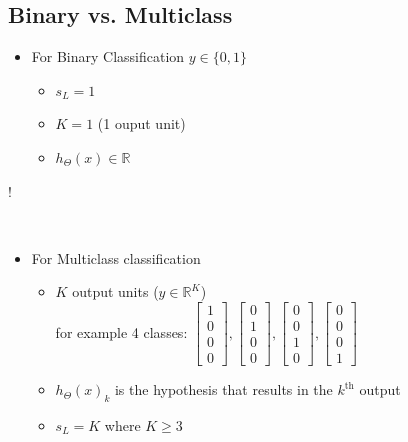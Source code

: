 \documentclass[a4paper,12pt]{report}
\begin{document}
\subsection{Binary vs. Multiclass}
\begin{itemize}
\item For Binary Classification $y \in \{0,1\}$
\begin{itemize}
\item $s_L = 1$
\item $K=1$ (1 ouput unit)
\item $h_{\Theta}(x) \in \mathbb{R}$
\end{itemize}
\end{itemize}
\resizebox {2in} {!} {
}  \\

\begin{itemize}
\item For Multiclass classification
\begin{itemize}
\item $K$ output units ($y \in \mathbb{R}^{K}$) \\
for example 4 classes: $\left[\begin{smallmatrix}1\\0\\0\\0 \end{smallmatrix} \right], \left[\begin{smallmatrix}0\\1\\0\\0 \end{smallmatrix} \right], \left[\begin{smallmatrix}0\\0\\1\\0 \end{smallmatrix} \right], \left[\begin{smallmatrix}0\\0\\0\\1 \end{smallmatrix} \right]$
\item $h_{\Theta}(x)_k$ is the hypothesis that results in the $k^{\mathrm{th}}$ output
\item $s_L = K$ where $K \geq 3$  
\end{itemize}
\end{itemize}
\end{document}
